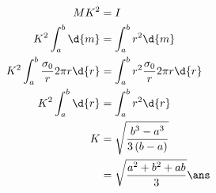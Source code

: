 \documentclass{article}
\begin{document}
\begin{align*}
MK^2 &= I\\
K^2\int_a^b \d{m} &= \int_a^b r^2\d{m}\\
K^2\int_a^b \dfrac{\sigma_0}{r} 2\pi r\d{r} &= \int_a^b r^2\dfrac{\sigma_0}{r} 2\pi r\d{r}\\
K^2\int_a^b \d{r} &= \int_a^b r^2 \d{r}\\
K &= \sqrt{\dfrac{b^3-a^3}{3\left(b-a\right)}}\\
	&=\sqrt{\dfrac{a^2+b^2+ab}{3}} \ans
\end{align*}


\pagebreak

\vspace*{\fill}
\begin{center}
	\fbox{\qrcode[height=2cm]{\gdrive}}
\end{center}
\vspace*{\fill}
\end{document}
